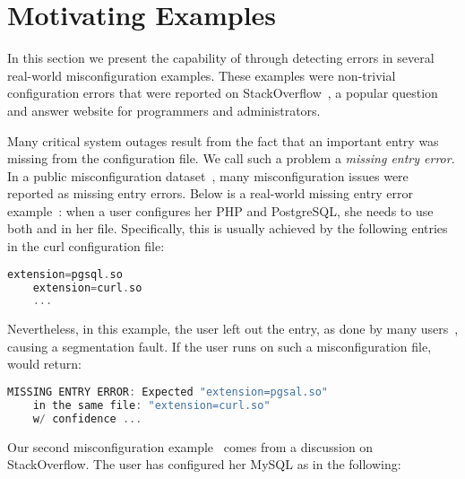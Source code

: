 \section{Motivating Examples}
\label{sec:motiv}

In this section we present the capability of \app through 
detecting errors in several real-world misconfiguration examples. 
These examples were non-trivial configuration errors
that were reported on StackOverflow~\cite{stackoverflow},
a popular question and answer website for programmers and administrators. 

Many critical system outages result from the fact that an important
entry was missing from the configuration file. 
We call such a problem a {\em missing entry error}.
In a public misconfiguration 
dataset~\cite{configdataset}, many misconfiguration issues were 
reported as missing entry errors.
Below is a real-world missing entry error example~\cite{missingentry}:
when a user configures her PHP and PostgreSQL,
she needs to use both  and 
in her  file.
Specifically, this is usually
achieved by the following entries in 
the curl configuration file:

\begin{lstlisting}[language=C, xleftmargin=.01\textwidth]
    extension=pgsql.so
    extension=curl.so
    ...
\end{lstlisting} 

Nevertheless, in this example, the user 
left out the  entry, 
as done by many users~\cite{yin11anempirical, missingentry}, 
causing a segmentation fault. 
If the user runs \app on such a misconfiguration file,
\app would return:

\begin{lstlisting}[language=C, xleftmargin=.01\textwidth]
    MISSING ENTRY ERROR: Expected "extension=pgsal.so"
    in the same file: "extension=curl.so"
    w/ confidence ...
\end{lstlisting} 

\label{ex:fine}
Our second misconfiguration example~\cite{correlation} 
comes from a discussion on StackOverflow.
The user has configured her MySQL as in the following:

